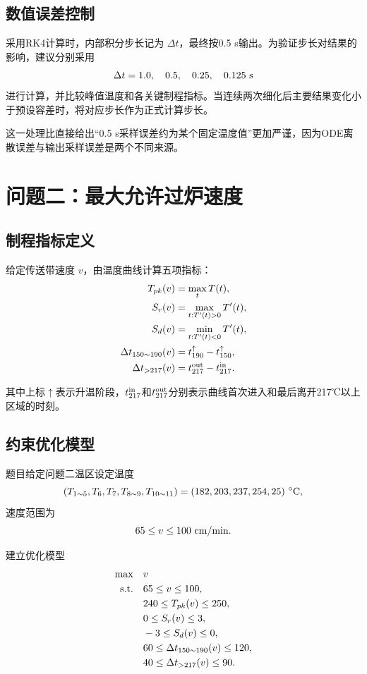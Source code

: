 \documentclass{cumcmthesis}
\begin{document}
\subsection{数值误差控制}

采用RK4计算时，内部积分步长记为 $\Delta t$，最终按0.5 s输出。为验证步长对结果的影响，建议分别采用
\[
\Delta t=1.0,\quad0.5,\quad0.25,\quad0.125\ {\rm s}
\]
进行计算，并比较峰值温度和各关键制程指标。当连续两次细化后主要结果变化小于预设容差时，将对应步长作为正式计算步长。

这一处理比直接给出“0.5 s采样误差约为某个固定温度值”更加严谨，因为ODE离散误差与输出采样误差是两个不同来源。

\section{问题二：最大允许过炉速度}

\subsection{制程指标定义}

给定传送带速度 $v$，由温度曲线计算五项指标：
\begin{align}
T_{pk}(v)&=\max_t T(t),\\
S_r(v)&=\max_{t:T'(t)>0}T'(t),\\
S_d(v)&=\min_{t:T'(t)<0}T'(t),\\
\Delta t_{150\sim190}(v)
&=
t_{190}^{\uparrow}-t_{150}^{\uparrow},\\
\Delta t_{>217}(v)
&=
t_{217}^{\rm out}-t_{217}^{\rm in}.
\end{align}

其中上标$\uparrow$表示升温阶段，$t_{217}^{\rm in}$和$t_{217}^{\rm out}$分别表示曲线首次进入和最后离开217℃以上区域的时刻。

\subsection{约束优化模型}

题目给定问题二温区设定温度
\[
(T_{1\sim5},T_6,T_7,T_{8\sim9},T_{10\sim11})
=(182,203,237,254,25)\ ^\circ{\rm C},
\]
速度范围为
\[
65\le v\le100\ {\rm cm/min}.
\]

建立优化模型
\begin{equation}
\begin{aligned}
\max\quad &v\\
{\rm s.t.}\quad
&65\le v\le100,\\
&240\le T_{pk}(v)\le250,\\
&0\le S_r(v)\le3,\\
&-3\le S_d(v)\le0,\\
&60\le\Delta t_{150\sim190}(v)\le120,\\
&40\le\Delta t_{>217}(v)\le90.
\end{aligned}
\label{eq:q2opt}
\end{equation}
\end{document}
